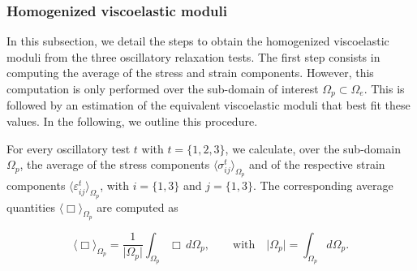 \documentclass[draft]{agujournal2019}
\begin{document}
\subsubsection{Homogenized viscoelastic moduli}
In this subsection, we detail the steps to obtain the homogenized viscoelastic moduli from the three oscillatory relaxation tests. The first step consists in computing the average of the  stress and strain components. However, this computation is only performed over the sub-domain of interest $\Omega_p \subset \Omega_e$. This is followed by an estimation of the equivalent viscoelastic moduli that best fit these values. In the following, we outline this procedure.

For every oscillatory test $t$ with $t = \{1,2,3\}$, we calculate, over the sub-domain $\Omega_p$, the average  of the stress components $\langle \sigma_{ij}^t \rangle_{\Omega_p}$ and of the respective strain components $\langle \varepsilon_{ij}^t \rangle_{\Omega_p}$, with $i=\{1,3\}$ and $j=\{1,3\}$. The corresponding average quantities $\langle \Box \rangle_{\Omega_p}$ are computed as
\begin{linenomath*}
\begin{equation}\label{Eq.12}
  \langle \Box \rangle_{\Omega_p} = \frac{1}{\vert \Omega_p \vert} \int_{\Omega_p} \Box \, d\Omega_p, \qquad \text{with} \quad  \vert \Omega_p \vert = \int_{\Omega_p}  d \Omega_p.
\end{equation}
\end{linenomath*}
\end{document}

